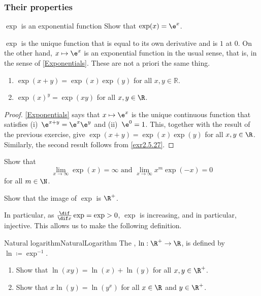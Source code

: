 \subsubsection{Their properties}

\begin{exr}{$\exp$ is an exponential function}{}
Show that $\exp (x)=\e ^x$.
\begin{rmk}
$\exp$ is the unique function that is equal to its own derivative and is $1$ at $0$.  On the other hand, $x\mapsto \e ^x$ is an exponential function in the usual sense, that is, in the sense of \cref{Exponentials}.  These are not a priori the same thing.
\end{rmk}
\end{exr}
\begin{crl}{}{}
\begin{enumerate}
\item $\exp (x+y)=\exp (x)\exp (y)$ for all $x,y \in \mathbb{R}$.
\item $\exp (x)^y=\exp (xy)$ for all $x,y\in \R$.
\end{enumerate}
\begin{proof}
\cref{Exponentials} says that $x\mapsto \e ^x$ is the unique continuous function that satisfies (i)~$\e ^{x+y}=\e ^x\e ^y$ and (ii)~$\e ^0=1$.  This, together with the result of the previous exercise, give $\exp (x+y)=\exp (x)\exp (y)$ for all $x,y\in \R$.  Similarly, the second result follows from \cref{exr2.5.27}.
\end{proof}
\end{crl}
\begin{exr}{}{}
Show that
\begin{equation}
\lim _{x\to \infty}\exp (x)=\infty \text{ and }\lim _{x\to \infty}x^m\exp (-x)=0
\end{equation}
for all $m\in \N$.
\end{exr}
\begin{exr}{}{}
Show that the image of $\exp$ is $\R ^+$.
\end{exr}
In particular, as $\frac{\dif}{\dif x}\exp =\exp >0$, $\exp$ is increasing, and in particular, injective.  This allows us to make the following definition.
\begin{dfn}{Natural logarithm}{NaturalLogarithm}
The , $\ln :\R ^+\rightarrow \R$, is defined by $\ln \coloneqq \exp ^{-1}$.
\end{dfn}
\begin{exr}{}{}
\begin{enumerate}
\item Show that $\ln (xy)=\ln (x)+\ln (y)$ for all $x,y\in \R ^+$.
\item Show that $x\ln (y)=\ln (y^x)$ for all $x\in \R$ and $y\in \R ^+$.
\end{enumerate}
\end{exr}
